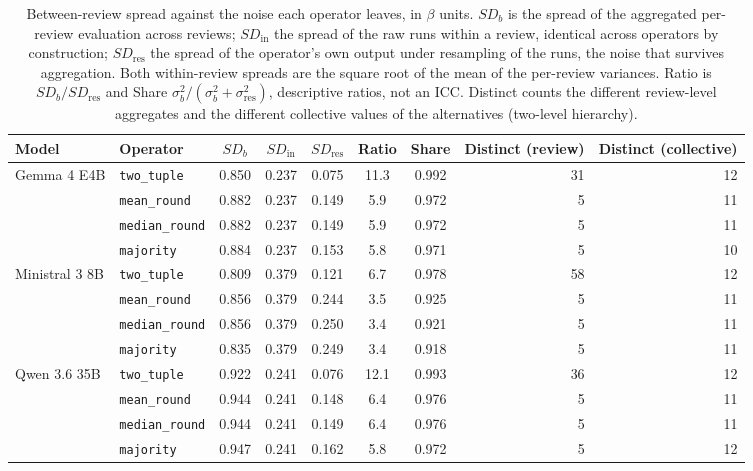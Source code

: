 \begin{table}[htbp]
\centering
\caption{Between-review spread against the noise each operator leaves, in $\beta$ units. $\mathit{SD}_b$ is the spread of the aggregated per-review evaluation across reviews; $\mathit{SD}_{\mathrm{in}}$ the spread of the raw runs within a review, identical across operators by construction; $\mathit{SD}_{\mathrm{res}}$ the spread of the operator's own output under resampling of the runs, the noise that survives aggregation. Both within-review spreads are the square root of the mean of the per-review variances. Ratio is $\mathit{SD}_b/\mathit{SD}_{\mathrm{res}}$ and Share $\sigma^2_b/(\sigma^2_b+\sigma^2_{\mathrm{res}})$, descriptive ratios, not an ICC. Distinct counts the different review-level aggregates and the different collective values of the alternatives (two-level hierarchy).}
\label{tab:cdm_discriminance}
\small
\begin{tabular}{llcccccrr}
\toprule
\textbf{Model} & \textbf{Operator} & \textbf{$\mathit{SD}_b$} & \textbf{$\mathit{SD}_{\mathrm{in}}$} & \textbf{$\mathit{SD}_{\mathrm{res}}$} & \textbf{Ratio} & \textbf{Share} & \textbf{Distinct (review)} & \textbf{Distinct (collective)} \\
\midrule
  \multirow{4}{*}{Gemma 4 E4B} & \texttt{two\_tuple} & 0.850 & 0.237 & 0.075 & 11.3 & 0.992 & 31 & 12 \\
   & \texttt{mean\_round} & 0.882 & 0.237 & 0.149 & 5.9 & 0.972 & 5 & 11 \\
   & \texttt{median\_round} & 0.882 & 0.237 & 0.149 & 5.9 & 0.972 & 5 & 11 \\
   & \texttt{majority} & 0.884 & 0.237 & 0.153 & 5.8 & 0.971 & 5 & 10 \\
\midrule
  \multirow{4}{*}{Ministral 3 8B} & \texttt{two\_tuple} & 0.809 & 0.379 & 0.121 & 6.7 & 0.978 & 58 & 12 \\
   & \texttt{mean\_round} & 0.856 & 0.379 & 0.244 & 3.5 & 0.925 & 5 & 11 \\
   & \texttt{median\_round} & 0.856 & 0.379 & 0.250 & 3.4 & 0.921 & 5 & 11 \\
   & \texttt{majority} & 0.835 & 0.379 & 0.249 & 3.4 & 0.918 & 5 & 11 \\
\midrule
  \multirow{4}{*}{Qwen 3.6 35B} & \texttt{two\_tuple} & 0.922 & 0.241 & 0.076 & 12.1 & 0.993 & 36 & 12 \\
   & \texttt{mean\_round} & 0.944 & 0.241 & 0.148 & 6.4 & 0.976 & 5 & 11 \\
   & \texttt{median\_round} & 0.944 & 0.241 & 0.149 & 6.4 & 0.976 & 5 & 11 \\
   & \texttt{majority} & 0.947 & 0.241 & 0.162 & 5.8 & 0.972 & 5 & 12 \\
\bottomrule
\end{tabular}
\end{table}
